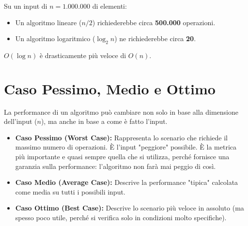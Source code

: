 \begin{example}
Su un input di $n = 1.000.000$ di elementi:
\begin{itemize}
    \item Un algoritmo lineare ($n/2$) richiederebbe circa \textbf{500.000} operazioni.
    \item Un algoritmo logaritmico ($\log_2 n$) ne richiederebbe circa \textbf{20}.
\end{itemize}
$O(\log n)$ è drasticamente più veloce di $O(n)$.
\end{example}

\section{Caso Pessimo, Medio e Ottimo}
La performance di un algoritmo può cambiare non solo in base alla dimensione dell'input ($n$), ma anche in base a come è fatto l'input.

\begin{observation}
\begin{itemize}
    \item \textbf{Caso Pessimo (Worst Case):} Rappresenta lo scenario che richiede il massimo numero di operazioni. È l'input "peggiore" possibile. È la metrica più importante e quasi sempre quella che si utilizza, perché fornisce una garanzia sulla performance: l'algoritmo non farà mai peggio di così.
    \item \textbf{Caso Medio (Average Case):} Descrive la performance "tipica" calcolata come media su tutti i possibili input.
    \item \textbf{Caso Ottimo (Best Case):} Descrive lo scenario più veloce in assoluto (ma spesso poco utile, perché si verifica solo in condizioni molto specifiche).
\end{itemize}
\end{observation}

